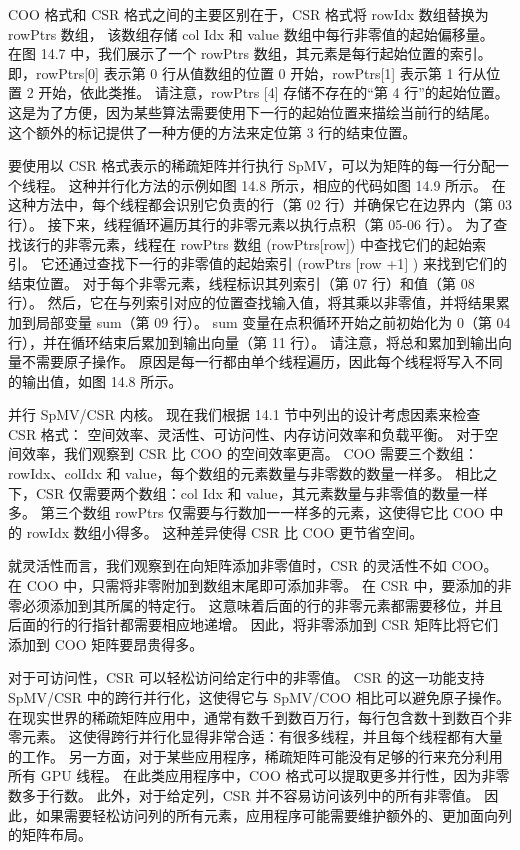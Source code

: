 COO 格式和 CSR 格式之间的主要区别在于，CSR 格式将 rowIdx 数组替换为 rowPtrs 数组，
该数组存储 col Idx 和 value 数组中每行非零值的起始偏移量。 
在图 14.7 中，我们展示了一个 rowPtrs 数组，其元素是每行起始位置的索引。 
即，rowPtrs[0] 表示第 0 行从值数组的位置 0 开始，rowPtrs[1] 表示第 1 行从位置 2 开始，依此类推。 
请注意，rowPtrs [4] 存储不存在的“第 4 行”的起始位置。 
这是为了方便，因为某些算法需要使用下一行的起始位置来描绘当前行的结尾。 
这个额外的标记提供了一种方便的方法来定位第 3 行的结束位置。

要使用以 CSR 格式表示的稀疏矩阵并行执行 SpMV，可以为矩阵的每一行分配一个线程。 
这种并行化方法的示例如图 14.8 所示，相应的代码如图 14.9 所示。 
在这种方法中，每个线程都会识别它负责的行（第 02 行）并确保它在边界内（第 03 行）。 
接下来，线程循环遍历其行的非零元素以执行点积（第 05-06 行）。 
为了查找该行的非零元素，线程在 rowPtrs 数组 (rowPtrs[row]) 中查找它们的起始索引。 
它还通过查找下一行的非零值的起始索引 (rowPtrs [row +1$]$ ) 来找到它们的结束位置。 
对于每个非零元素，线程标识其列索引（第 07 行）和值（第 08 行）。 
然后，它在与列索引对应的位置查找输入值，将其乘以非零值，并将结果累加到局部变量 sum（第 09 行）。 
sum 变量在点积循环开始之前初始化为 0（第 04 行），并在循环结束后累加到输出向量（第 11 行）。 
请注意，将总和累加到输出向量不需要原子操作。 
原因是每一行都由单个线程遍历，因此每个线程将写入不同的输出值，如图 14.8 所示。

并行 SpMV/CSR 内核。 现在我们根据 14.1 节中列出的设计考虑因素来检查 CSR 格式：
空间效率、灵活性、可访问性、内存访问效率和负载平衡。 对于空间效率，我们观察到 CSR 比 COO 的空间效率更高。 
COO 需要三个数组：rowIdx、colIdx 和 value，每个数组的元素数量与非零数的数量一样多。 
相比之下，CSR 仅需要两个数组：col Idx 和 value，其元素数量与非零值的数量一样多。 
第三个数组 rowPtrs 仅需要与行数加一一样多的元素，这使得它比 COO 中的 rowIdx 数组小得多。 
这种差异使得 CSR 比 COO 更节省空间。

就灵活性而言，我们观察到在向矩阵添加非零值时，CSR 的灵活性不如 COO。 
在 $\mathrm{COO}$ 中，只需将非零附加到数组末尾即可添加非零。 在 CSR 中，要添加的非零必须添加到其所属的特定行。 
这意味着后面的行的非零元素都需要移位，并且后面的行的行指针都需要相应地递增。 
因此，将非零添加到 CSR 矩阵比将它们添加到 $\mathrm{COO}$ 矩阵要昂贵得多。

对于可访问性，CSR 可以轻松访问给定行中的非零值。 
CSR 的这一功能支持 SpMV/CSR 中的跨行并行化，这使得它与 SpMV/COO 相比可以避免原子操作。 
在现实世界的稀疏矩阵应用中，通常有数千到数百万行，每行包含数十到数百个非零元素。 
这使得跨行并行化显得非常合适：有很多线程，并且每个线程都有大量的工作。 
另一方面，对于某些应用程序，稀疏矩阵可能没有足够的行来充分利用所有 GPU 线程。 
在此类应用程序中，COO 格式可以提取更多并行性，因为非零数多于行数。 
此外，对于给定列，CSR 并不容易访问该列中的所有非零值。 
因此，如果需要轻松访问列的所有元素，应用程序可能需要维护额外的、更加面向列的矩阵布局。

